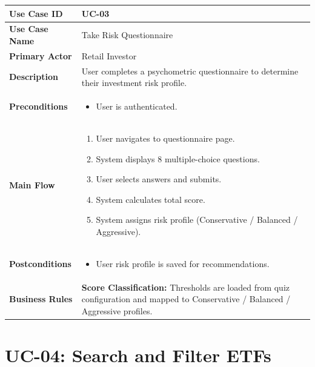 \begin{longtable}{|>{\raggedright\arraybackslash\bfseries}p{3.5cm}|p{11cm}|}
\hline
\rowcolor{gray!15} Use Case ID & UC-03 \\ \hline
Use Case Name & Take Risk Questionnaire \\ \hline
Primary Actor & Retail Investor \\ \hline
Description & User completes a psychometric questionnaire to determine their investment risk profile. \\ \hline
Preconditions &
\begin{itemize}[leftmargin=*, nosep]
    \item User is authenticated.
\end{itemize} \\ \hline
Main Flow &
\begin{enumerate}[leftmargin=*, nosep]
    \item User navigates to questionnaire page.
    \item System displays 8 multiple-choice questions.
    \item User selects answers and submits.
    \item System calculates total score.
    \item System assigns risk profile (Conservative / Balanced / Aggressive).
\end{enumerate} \\ \hline
Postconditions &
\begin{itemize}[leftmargin=*, nosep]
    \item User risk profile is saved for recommendations.
\end{itemize} \\ \hline
Business Rules &
\textbf{Score Classification:} Thresholds are loaded from quiz configuration and mapped to Conservative / Balanced / Aggressive profiles. \\ \hline
\end{longtable}

\section{UC-04: Search and Filter ETFs}
\label{uc:search-filter}


